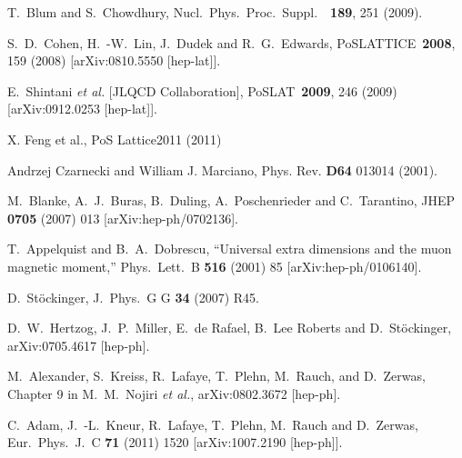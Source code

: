 \begin{thebibliography}{99}
  T.~Blum and S.~Chowdhury,
  Nucl.\ Phys.\ Proc.\ Suppl.\ \ {\bf 189}, 251  (2009).

  S.~D.~Cohen, H.~-W.~Lin, J.~Dudek and R.~G.~Edwards,
  PoSLATTICE\ {\bf 2008}, 159  (2008)
  [arXiv:0810.5550 [hep-lat]].


  E.~Shintani {\it et al.} [JLQCD Collaboration],
  PoSLAT\ {\bf 2009}, 246  (2009)
  [arXiv:0912.0253 [hep-lat]].

X. Feng et al., PoS Lattice2011 (2011)


  Andrzej Czarnecki and William J. Marciano,
Phys. Rev. {\bf D64} 013014 (2001).

  M.~Blanke, A.~J.~Buras, B.~Duling, A.~Poschenrieder and C.~Tarantino,
  JHEP {\bf 0705} (2007) 013
  [arXiv:hep-ph/0702136].

 T.~Appelquist and B.~A.~Dobrescu, ``Universal extra
dimensions and the muon magnetic moment,'' Phys.\ Lett.\ B
\textbf{516}
(2001) 85 [arXiv:hep-ph/0106140]. %

 D.\ St\"ockinger,
  J.\ Phys.\ G G {\bf 34} (2007) R45.

 D.~W.~Hertzog, J.~P.~Miller, E.~de Rafael, B.~Lee
Roberts and D.~St\"ockinger,
arXiv:0705.4617 [hep-ph]. %

 M.~Alexander, S.~Kreiss, R.~Lafaye, T.~Plehn,
M.~Rauch, and D.~Zerwas, Chapter 9 in M.~M.~Nojiri \textit{et al.},
arXiv:0802.3672 [hep-ph]. %

  C.~Adam, J.~-L.~Kneur, R.~Lafaye, T.~Plehn, M.~Rauch and D.~Zerwas,
  Eur.\ Phys.\ J.\ C {\bf 71} (2011) 1520
  [arXiv:1007.2190 [hep-ph]].


\end{thebibliography}
